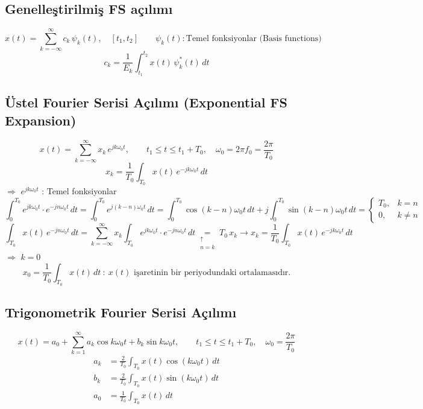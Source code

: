 \documentclass[11pt,a4paper]{article}
\begin{document}
\subsection{Genelleştirilmiş FS açılımı}
\[ x(t) = \sum_{k=-\infty}^{\infty} c_k\,\psi_k(t), \quad [t_1, t_2] \qquad \psi_k(t): \text{Temel fonksiyonlar (Basis functions)} \]
\[ c_k = \frac{1}{E_k}\int_{t_1}^{t_2} x(t)\,\psi_k^{*}(t)\,dt \]

\subsection{Üstel Fourier Serisi Açılımı \normalfont(Exponential FS Expansion)}
\[ x(t) = \sum_{k=-\infty}^{\infty} x_k\,e^{jk\omega_0 t}, \qquad t_1 \leq t \leq t_1 + T_0, \quad \omega_0 = 2\pi f_0 = \frac{2\pi}{T_0} \]
\[ x_k = \frac{1}{T_0}\int_{T_0} x(t)\,e^{-jk\omega_0 t}\,dt \]
$\Rightarrow$ $e^{jk\omega_0 t}$ : Temel fonksiyonlar
\[ \int_{0}^{T_0} e^{jk\omega_0 t}\cdot e^{-jn\omega_0 t}\,dt = \int_{0}^{T_0} e^{j(k-n)\omega_0 t}\,dt = \int_{0}^{T_0} \cos(k-n)\omega_0 t\,dt + j\int_{0}^{T_0} \sin(k-n)\omega_0 t\,dt = \begin{cases} T_0, & k = n \\ 0, & k \neq n \end{cases} \]
\[ \int_{T_0} x(t)\,e^{-jn\omega_0 t}\,dt = \sum_{k=-\infty}^{\infty} x_k \int_{T_0} e^{jk\omega_0 t}\cdot e^{-jn\omega_0 t}\,dt \underset{\substack{\uparrow\\ n=k}}{=} T_0\,x_k \longrightarrow x_k = \frac{1}{T_0}\int_{T_0} x(t)\,e^{-jk\omega_0 t}\,dt \]
$\Rightarrow$ $k = 0$
\[ x_0 = \frac{1}{T_0}\int_{T_0} x(t)\,dt \ : \ x(t) \text{ işaretinin bir periyodundaki ortalamasıdır.} \]

\subsection{Trigonometrik Fourier Serisi Açılımı}
\[ x(t) = a_0 + \sum_{k=1}^{\infty} a_k\cos k\omega_0 t + b_k\sin k\omega_0 t, \qquad t_1 \leq t \leq t_1 + T_0, \quad \omega_0 = \frac{2\pi}{T_0} \]
\begin{align*}
  a_k &= \frac{2}{T_0}\int_{T_0} x(t)\cos(k\omega_0 t)\,dt \\
  b_k &= \frac{2}{T_0}\int_{T_0} x(t)\sin(k\omega_0 t)\,dt \\
  a_0 &= \frac{1}{T_0}\int_{T_0} x(t)\,dt
\end{align*}
\end{document}
